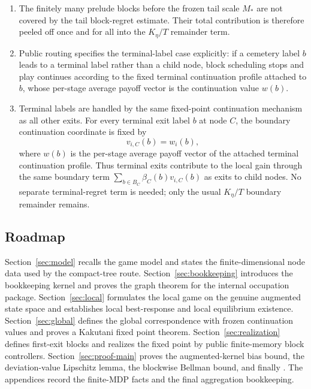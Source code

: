 \documentclass[12pt]{article}
\theoremstyle{definition}
\newcommand{\1}{\mathbf{1}}
\begin{document}
\begin{enumerate}[label=\textnormal{(\arabic*)},leftmargin=2.4em]
confined to $[0,d_\eta(C)]$ and boundary continuation values to
$[0,d_\eta(C)-1]^N$, where $d_\eta(C)$ is the remaining tree depth below $C$.
This is the correct box because each node contributes at most one unit of stage
payoff and continuation values propagate through only finitely many further
layers.
\item The finitely many prelude blocks before the frozen tail scale $M_*$ are not
covered by the tail block-regret estimate. Their total contribution is therefore
peeled off once and for all into the $K_\eta/T$ remainder term.
\item Public routing specifies the terminal-label case explicitly: if a cemetery
label $b$ leads to a terminal label rather than a child node, block scheduling
stops and play continues according to the fixed terminal continuation profile
attached to $b$, whose per-stage average payoff vector is the continuation
value $w(b)$.
\item Terminal labels are handled by the same fixed-point continuation mechanism
as all other exits. For every terminal exit label $b$ at node $C$, the boundary
continuation coordinate is fixed by
\[
v_{i,C}(b)=w_i(b),
\]
where $w(b)$ is the per-stage average payoff vector of the attached terminal
continuation profile. Thus terminal exits contribute to the local gain through
the same boundary term $\sum_{b\in B_C}\beta_C(b)v_{i,C}(b)$ as exits to child
nodes. No separate terminal-regret term is needed; only the usual
$K_\eta/T$ boundary remainder remains.
\end{enumerate}

\subsection{Roadmap}


Section~\ref{sec:model} recalls the game model and states the finite-dimensional
node data used by the compact-tree route. Section~\ref{sec:bookkeeping}
introduces the bookkeeping kernel and proves the graph theorem for the internal
occupation package. Section~\ref{sec:local} formulates the local game on the
genuine augmented state space and establishes local best-response and local
equilibrium existence. Section~\ref{sec:global} defines the global correspondence
with frozen continuation values and proves a Kakutani fixed point theorem.
Section~\ref{sec:realization} defines first-exit blocks and realizes the fixed
point by public finite-memory block controllers. Section~\ref{sec:proof-main}
proves the augmented-kernel bias bound, the deviation-value Lipschitz lemma, the
blockwise Bellman bound, and finally . The appendices record the
finite-MDP facts and the final aggregation bookkeeping.
\end{document}
